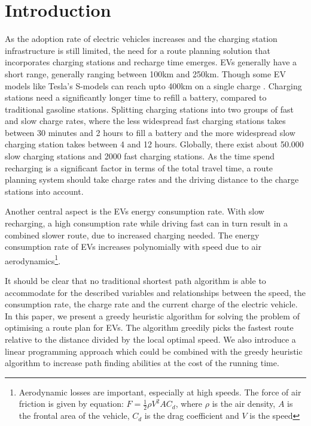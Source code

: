 \section{Introduction}

As the adoption rate of electric vehicles increases \cite{Henry2013} and the charging station infrastructure is still limited, the need for a route planning solution that incorporates charging stations and recharge time emerges. EVs generally have a short range, generally ranging between 100km and 250km. Though some EV models like Tesla's S-models can reach upto 400km on a single charge \cite{teslacon}. Charging stations need a significantly longer time to refill a battery, compared to traditional gasoline stations. Splitting charging stations into two groups of fast and slow charge rates, where the less widespread fast charging stations takes between 30 minutes and 2 hours to fill a battery and the more widespread slow charging station takes between 4 and 12 hours. Globally, there exist about 50.000 slow charging stations and 2000 fast charging stations\cite{Globalevoutlook}. As the time spend recharging is a significant factor in terms of the total travel time, a route planning system should take charge rates and the driving distance to the charge stations into account.

Another central aspect is the EVs energy consumption rate. With slow recharging, a high consumption rate while driving fast can in turn result in a combined slower route, due to increased charging needed. The energy consumption rate of EVs increases polynomially with speed due to air aerodynamics\footnote{Aerodynamic losses are important, especially at high speeds. The force of air friction is given by equation: $F = \frac{1}{2} \rho V^2 A C_d$, where $\rho$ is the air density, $A$ is the frontal area of the vehicle, $C_d$ is the drag coefficient and $V$ is the speed}.

It should be clear that no traditional shortest path algorithm is able to accommodate for the described variables and relationships between the speed, the consumption rate, the charge rate and the current charge of the electric vehicle. In this paper, we present a greedy heuristic algorithm for solving the problem of optimising a route plan for EVs. The algorithm greedily picks the fastest route relative to the distance divided by the local optimal speed. We also introduce a linear programming approach which could be combined with the greedy heuristic algorithm to increase path finding abilities at the cost of the running time.  
